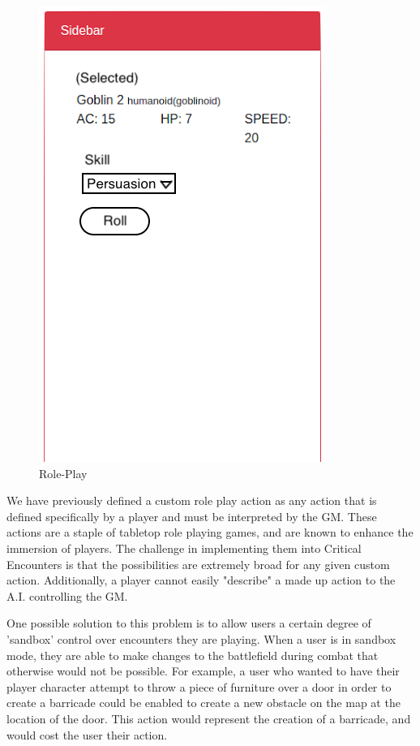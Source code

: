\documentclass[12pt,a4paper]{report}
\begin{document}
		\begin{figure}[H]
			\centering
			\includegraphics[scale=.7]{roleplay}
			\caption{Role-Play}
			\label{fig: Role-Play}
		\end{figure}
		
		We have previously defined a custom role play action as any action that is defined specifically by a player and must be interpreted by the GM. These actions are a staple of tabletop role playing games, and are known to enhance the immersion of players. The challenge in implementing them into Critical Encounters is that the possibilities are extremely broad for any given custom action. Additionally, a player cannot easily "describe" a made up action to the A.I. controlling the GM. 
		
		One possible solution to this problem is to allow users a certain degree of 'sandbox' control over encounters they are playing. When a user is in sandbox mode, they are able to make changes to the battlefield during combat that otherwise would not be possible. For example, a user who wanted to have their player character attempt to throw a piece of furniture over a door in order to create a barricade could be enabled to create a new obstacle on the map at the location of the door. This action would represent the creation of a barricade, and would cost the user their action. 
		
\end{document}
